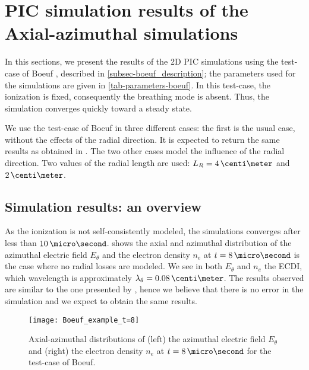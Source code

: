 
\section{PIC simulation results of the Axial-azimuthal simulations}
  \label{sec-Zthetaresults}
  In this sections, we present the results of the \ac{2D} \ac{PIC} simulations using the test-case of Boeuf \citep{boeuf2018}, described in \cref{subsec-boeuf_description}\string; the parameters used for the simulations are given in \vref{tab-parameters-boeuf}.
  In this test-case, the ionization is fixed, consequently the breathing mode is absent.
  Thus, the simulation converges quickly toward a steady state.
  
  We use the test-case of Boeuf in three different cases\string:
  the first is the usual case, without the effects of the radial direction.
  It is expected to return the same results as obtained in \citet{boeuf2018}.
  The two other cases model the influence of the radial direction.
  Two values of the radial length are used\string: $L_R=4\,\centi\meter$ and $2\,\centi\meter$.

  
  \subsection{Simulation results\string: an overview} \label{subsec-boeuf-overview}
  As the ionization is not self-consistently modeled, the simulations converges after less than $10\,\micro\second$.
   shows the axial and azimuthal distribution of the azimuthal electric field $E_{\theta}$ and the electron density $n_e$ at $t=8\,\micro\second$ is the case where no radial losses are modeled.
  We see in both $E_{\theta}$ and $n_e$ the \ac{ECDI}, which wavelength is approximately $\lambda_{\theta} = 0.08\,\centi\meter$.
  The results observed are similar to the one presented by \citet{boeuf2018}, hence we believe that there is no error in the simulation and we expect to obtain the same results.

  \begin{figure}[hbt]
    \centering
    \texttt{[image: Boeuf\_example\_t=8]}
    \caption{ Axial-azimuthal distributions of (left) the azimuthal electric field $E_{\theta}$ and (right) the electron density $n_e$ at $t=8\,\micro\second$ for the test-case of Boeuf. } 
    \label{fig-overview_boeuf_neEx}
  \end{figure}

